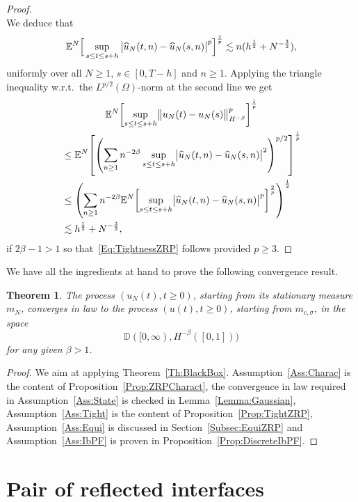 \documentclass[10pt]{amsart}
\newtheorem{theo}{Theorem}[section]
\theoremstyle{definition}\newtheorem{defi}[theo]{Definition}\newtheorem{rema}[theo]{Remark}\newtheorem{exam}[theo]{Example}\newtheorem{exem}[theo]{Example}\newtheorem{nota}[theo]{Notation}
\theoremstyle{plain}
\newcommand{\bbD}{\mathbb{D}}
\newcommand{\bbE}{\mathbb{E}}
\let\oldhat\hat
\renewcommand*{\hat}[1]{\mathchoice{\widehat{#1}}{\widehat{#1}}{\oldhat{#1}}{\oldhat{#1}}}
\let\originalleft\left
\let\originalright\right
\renewcommand{\left}{\mathopen{}\mathclose\bgroup\originalleft}
\renewcommand{\right}{\aftergroup\egroup\originalright}
\begin{document}
\begin{proof}
\[\]
We deduce that
\begin{equation*}
\bbE^N \Big[\sup_{s\leq t \leq s+h} \big|\hat{u}_N(t,n)-\hat{u}_N(s,n)\big|^p\Big]^{\frac{1}{p}} \lesssim n(h^{\frac{1}{2}} + N^{-\frac{3}{2}}),
\end{equation*}
uniformly over all $N\geq 1$, $s\in [0,T-h]$ and $n\geq 1$. Applying the triangle inequality w.r.t.~the $L^{p/2}(\Omega)$-norm at the second line we get
\begin{multline*}
\bbE^N \left[\sup_{s\leq t \leq s+h} \bigl\|u_N(t)-u_N(s)\bigr\|^p_{H^{-\beta}}\right]^{\frac{1}{p}}\\
\begin{aligned} 
&\leq \bbE^N \left[\left(\sum_{n\geq 1} n^{-2\beta}\sup_{s\leq t \leq s+h} \bigl|\hat{u}_N(t,n)-\hat{u}_N(s,n)\bigr|^{2}\right)^{p/2}\right]^{\frac{1}{p}}\\
&\leq \left(\sum_{n\geq 1} n^{-2\beta} \bbE^N \left[\sup_{s\leq t \leq s+h} \bigl|\hat{u}_N(t,n)-\hat{u}_N(s,n)\bigr|^{p}\right]^{\frac{2}{p}}\right)^{\frac{1}{2}}\\
&\lesssim h^{\frac{1}{2}} + N^{-\frac{3}{2}},
\end{aligned}
\end{multline*}
if $2\beta-1>1$ so that~\eqref{Eq:TightnessZRP} follows provided $p\ge 3$.
\end{proof}

We have all the ingredients at hand to prove the following convergence result.

\begin{theo}\label{Th:ZRP}
The process $(u_N(t), t\ge 0)$, starting from its stationary measure $m_N$, converges in law to the process $(u(t),t\ge 0)$, starting from $m_{c,\sigma}$, in the space
\[
\bbD([0,\infty),H^{-\beta}([0,1]))
\]
for any given $\beta > 1$.
\end{theo}
\begin{proof}
We aim at applying Theorem~\ref{Th:BlackBox}. Assumption~\ref{Ass:Charac} is the content of Proposition~\ref{Prop:ZRPCharact}, the convergence in law required in Assumption~\ref{Ass:State} is checked in Lemma~\ref{Lemma:Gaussian}, Assumption~\ref{Ass:Tight} is the content of Proposition~\ref{Prop:TightZRP}, Assumption~\ref{Ass:Equi} is discussed in Section~\ref{Subsec:EquiZRP} and Assumption~\ref{Ass:IbPF} is proven in Proposition~\ref{Prop:DiscreteIbPF}.
\end{proof}


\section{Pair of reflected interfaces}\label{Sec:Reflected}
\end{document}
